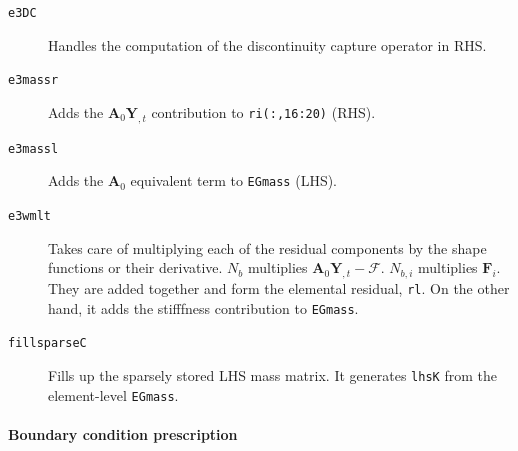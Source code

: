 \documentclass{ucb}
\begin{document}
\begin{description}
    \item[\texttt{e3DC}] Handles the computation of the discontinuity capture operator in RHS.
    
    \item[\texttt{e3massr}] Adds the $\bm{A}_0 \bm{Y}_{,t}$ contribution to \texttt{ri(:,16:20)} (RHS).
    
    \item[\texttt{e3massl}] Adds the $\bm{A}_0$ equivalent term to \texttt{EGmass} (LHS).
    
    \item[\texttt{e3wmlt}] Takes care of multiplying each of the residual components by the shape functions or their derivative. $N_b$ multiplies $\bm{A}_0\bm{Y}_{,t} - \bm{\mathcal{F}}$. $N_{b,i}$ multiplies $\bm{F}_i$.  They are added together and form the elemental residual, \texttt{rl}. On the other hand, it adds the stifffness contribution to \texttt{EGmass}.
    
    \item[\texttt{fillsparseC}] Fills up the sparsely stored LHS mass matrix. It generates \texttt{lhsK} from the element-level \texttt{EGmass}.

\end{description}

\paragraph{Boundary condition prescription}
\end{document}
